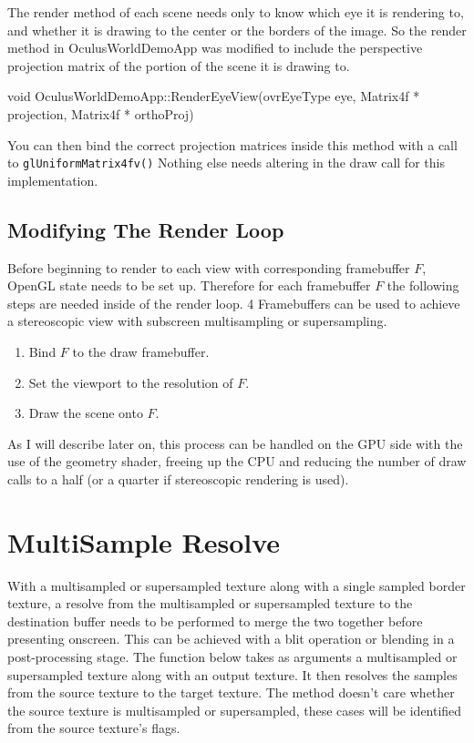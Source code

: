 \documentclass[12pt,a4paper,twoside,openright]{report}
\begin{document}
The render method of each scene needs only to know which eye it is rendering to, and whether it is drawing to the center or the borders of the image. 
So the render method in OculusWorldDemoApp was modified to include the perspective projection matrix of the portion of the scene it is drawing to.

\begin{blockcode}[commandchars=\\\{\}]
void OculusWorldDemoApp::RenderEyeView(ovrEyeType eye,
                                       \color{green}Matrix4f * projection,
                                       \color{green}Matrix4f * orthoProj)
\end{blockcode}

You can then bind the correct projection matrices inside this method with a call to \texttt{glUniformMatrix4fv()}
Nothing else needs altering in the draw call for this implementation.

\subsection{Modifying The Render Loop}

Before beginning to render to each view with corresponding framebuffer $F$, OpenGL state needs to be set up. Therefore for each framebuffer $F$ the following steps are needed inside of the render loop. 4 Framebuffers can be used to achieve a stereoscopic view with subscreen multisampling or supersampling.

\begin{enumerate}

\item Bind $F$ to the draw framebuffer.
\item Set the viewport to the resolution of $F$.
\item Draw the scene onto $F$.

\end{enumerate}

As I will describe later on, this process can be handled on the GPU side with the use of the geometry shader, freeing up the CPU and reducing the number of draw calls to a half (or a quarter if stereoscopic rendering is used).

\section{MultiSample Resolve}\label{resolving}

With a multisampled or supersampled texture along with a single sampled border texture, a resolve from the multisampled or supersampled texture to the destination buffer needs to be performed to merge the two together before presenting onscreen. This can be achieved with a blit operation or blending in a post-processing stage.
The function below takes as arguments a multisampled or supersampled texture along with an output texture. It then resolves the samples from the source texture to the target texture. The method doesn't care whether the source texture is multisampled or supersampled, these cases will be identified from the source texture's flags.
\end{document}
